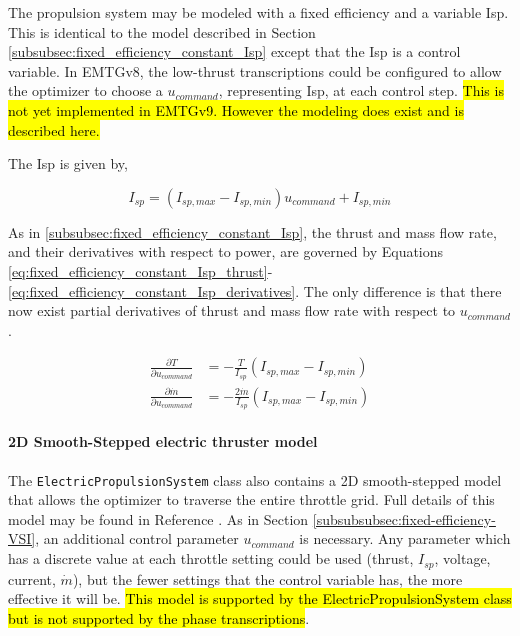 The propulsion system may be modeled with a fixed efficiency and a variable \ac{Isp}. This is identical to the model described in Section \ref{subsubsec:fixed_efficiency_constant_Isp} except that the \ac{Isp} is a control variable. In EMTGv8, the low-thrust transcriptions could be configured to allow the optimizer to choose a $u_{command}$, representing \ac{Isp}, at each control step. \hl{This is not yet implemented in EMTGv9. However the modeling does exist and is described here.}

The \ac{Isp} is given by,

\begin{equation}
I_{sp} = \left(I_{sp,max} - I_{sp,min}\right) u_{command} + I_{sp,min}
\label{eq:fixed_efficiency_VSI_Isp}
\end{equation}

As in \ref{subsubsec:fixed_efficiency_constant_Isp}, the thrust and mass flow rate, and their derivatives with respect to power, are governed by Equations \ref{eq:fixed_efficiency_constant_Isp_thrust}-\ref{eq:fixed_efficiency_constant_Isp_derivatives}. The only difference is that there now exist partial derivatives of thrust and mass flow rate with respect to $u_{command}$.

\begin{align}
	\frac{\partial T}{\partial u_{command}} &= -\frac{T}{I_{sp}} \left(I_{sp,max} - I_{sp,min}\right)\\
	\frac{\partial \dot m}{\partial u_{command}} &= -\frac{2 \dot m}{I_{sp}} \left(I_{sp,max} - I_{sp,min}\right)	
\label{eq:fixed_efficiency_VSI_derivatives_wrt_Isp}
\end{align}

\noindent\paragraph{2D Smooth-Stepped electric thruster model}
\label{subsubsubsec:2D-smooth-stepped}

The \texttt{ElectricPropulsionSystem} class also contains a 2D smooth-stepped model that allows the optimizer to traverse the entire throttle grid. Full details of this model may be found in Reference \cite{Knittel_2Dthrottle}. As in Section \ref{subsubsubsec:fixed-efficiency-VSI}, an additional control parameter $u_{command}$ is necessary. Any parameter which has a discrete value at each throttle setting could be used (thrust, $I_{sp}$, voltage, current, $\dot{m}$), but the fewer settings that the control variable has, the more effective it will be. \hl{This model is supported by the ElectricPropulsionSystem class but is not supported by the phase transcriptions}.

